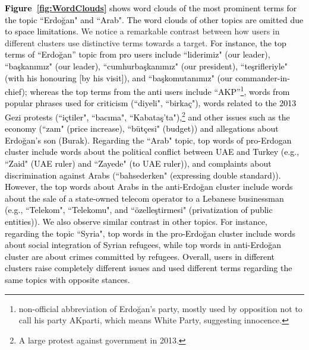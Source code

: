 \documentclass[letterpaper]{article} \usepackage{aaai20}  \usepackage{times}  \usepackage{stackengine}
\newcommand{\changes}{\textcolor{black}}
\begin{document}
\changes{
\textbf{Figure~\ref{fig:WordClouds}} shows word clouds of the most prominent terms for the topic ``Erdo\u{g}an" and ``Arab". The word clouds of other topics are omitted due to space limitations.}
We notice a remarkable contrast between how users in different clusters use distinctive terms towards a target. 
\changes{For instance, the top terms of ``Erdo\u{g}an'' topic from pro users include ``liderimiz" (our leader), ``ba\c{s}kan{\i}m{\i}z" (our leader), ``cumhurba\c{s}kan{\i}m{\i}z" (our president), ``te\c{s}rifleriyle" (with his honouring [by his visit]), and ``ba\c{s}komutan{\i}m{\i}z" (our commander-in-chief); whereas the top terms from the anti users include ``AKP''\footnote{non-official abbreviation of Erdo\u{g}an's party, mostly used by opposition not to call his party AKparti, which means White Party, suggesting innocence.}, words from popular phrases used for criticism (``diyeli", ``birka\c{c}"), words related to the 2013 Gezi protests (``i\c{c}tiler", ``bac{\i}ma", ``Kabata\c{s}'ta"),\footnote{A large protest against government in 2013.} and other issues such as the economy (``zam" (price increase), ``b\"{u}t\c{c}esi" (budget)) and allegations about Erdo\u{g}an's son (Burak). 
}
\changes{
Regarding the ``Arab" topic, top words of pro-Erdogan cluster include words about the political conflict between UAE and Turkey (e.g., ``Zaid" (UAE ruler) and ``Zayede" (to UAE ruler)), and complaints about discrimination against Arabs (``bahsederken" (expressing double standard)). However, the top words about Arabs in the anti-Erdo\u{g}an cluster include words about the sale of a state-owned telecom operator to a Lebanese businessman (e.g., ``Telekom", ``Telekomu", and ``\"{o}zelle\c{s}tirmesi" (privatization of public entities)).  We also observe similar contrast in other topics. For instance, regarding the topic ``Syria", top words in the pro-Erdo\u{g}an cluster include words about social integration of Syrian refugees, while top words in anti-Erdo\u{g}an cluster are about crimes committed by refugees. 
Overall, users in different clusters raise completely different issues and used different terms regarding the same topics with opposite stances.
}
\end{document}
